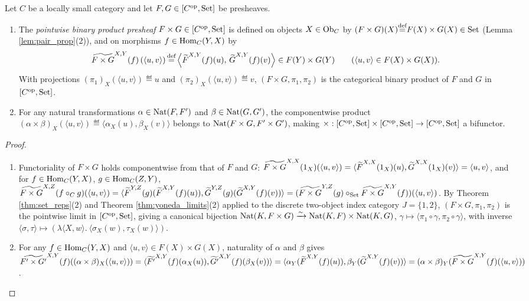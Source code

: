 \documentclass[10pt,a4paper]{article}
\renewcommand{\myprf}{\begin{proof}}
\renewcommand{\myqed}{\end{proof}}
\begin{document}
\begin{lemma}\label{lem:presheaf_product}
Let $C$ be a locally small category and let $F, G \in [C^{\textrm{op}}, {\textrm{Set}}]$ be presheaves.
\begin{enumerate}
\item The \emph{pointwise binary product presheaf} $F \times G \in [C^{\textrm{op}}, {\textrm{Set}}]$ is defined on objects $X \in {\textrm{Ob}}_C$ by $(F \times G)(X) {\stackrel{{\textrm{def}}}{=}} F(X) \times G(X) \in {\textrm{Set}}$ (Lemma \ref{lem:pair_prop}(2)), and on morphisms $f \in {\textrm{Hom}}_C(Y, X)$ by
$$\widetilde{F \times G}^{X,Y}(f)\left(\langle u, v \rangle\right) {\stackrel{{\textrm{def}}}{=}} \left\langle {\widetilde{F}\textrm{}}^{X,Y}(f)(u),\, {\widetilde{G}\textrm{}}^{X,Y}(f)(v) \right\rangle \in F(Y) \times G(Y) \qquad (\langle u, v \rangle \in F(X) \times G(X)).$$
With projections $(\pi_1)_X(\langle u, v \rangle) \eqdef u$ and $(\pi_2)_X(\langle u, v \rangle) \eqdef v$, $(F \times G, \pi_1, \pi_2)$ is the categorical binary product of $F$ and $G$ in $[C^{\textrm{op}}, {\textrm{Set}}]$.
\item For any natural transformations $\alpha \in {\textrm{Nat}}(F, F')$ and $\beta \in {\textrm{Nat}}(G, G')$, the componentwise product $(\alpha \times \beta)_X(\langle u, v \rangle) \eqdef \langle \alpha_X(u), \beta_X(v) \rangle$ belongs to ${\textrm{Nat}}(F \times G, F' \times G')$, making $\times : [C^{\textrm{op}}, {\textrm{Set}}] \times [C^{\textrm{op}}, {\textrm{Set}}] \to [C^{\textrm{op}}, {\textrm{Set}}]$ a bifunctor.
\end{enumerate}
\end{lemma}
\myprf
\begin{enumerate}
\item Functoriality of $F \times G$ holds componentwise from that of $F$ and $G$: $\widetilde{F \times G}^{X,X}(1_X)(\langle u, v \rangle) = \langle {\widetilde{F}\textrm{}}^{X,X}(1_X)(u), {\widetilde{G}\textrm{}}^{X,X}(1_X)(v) \rangle = \langle u, v \rangle$, and for $f \in {\textrm{Hom}}_C(Y, X)$, $g \in {\textrm{Hom}}_C(Z, Y)$, $\widetilde{F \times G}^{X,Z}(f \circ_C g)(\langle u, v \rangle) = \langle {\widetilde{F}\textrm{}}^{Y,Z}(g)({\widetilde{F}\textrm{}}^{X,Y}(f)(u)), {\widetilde{G}\textrm{}}^{Y,Z}(g)({\widetilde{G}\textrm{}}^{X,Y}(f)(v)) \rangle = (\widetilde{F \times G}^{Y,Z}(g) \circ_{\textrm{Set}} \widetilde{F \times G}^{X,Y}(f))(\langle u, v \rangle)$. By Theorem \ref{thm:set_reps}(2) and Theorem \ref{thm:yoneda_limits}(2) applied to the discrete two-object index category $J = \{1, 2\}$, $(F \times G, \pi_1, \pi_2)$ is the pointwise limit in $[C^{\textrm{op}}, {\textrm{Set}}]$, giving a canonical bijection ${\textrm{Nat}}(K, F \times G) \xrightarrow{\sim} {\textrm{Nat}}(K, F) \times {\textrm{Nat}}(K, G)$, $\gamma \mapsto \langle \pi_1 \circ \gamma, \pi_2 \circ \gamma \rangle$, with inverse $\langle \sigma, \tau \rangle \mapsto (\lambda \langle X, w \rangle.\ \langle \sigma_X(w), \tau_X(w) \rangle)$.
\item For any $f \in {\textrm{Hom}}_C(Y, X)$ and $\langle u, v \rangle \in F(X) \times G(X)$, naturality of $\alpha$ and $\beta$ gives $\widetilde{F' \times G'}^{X,Y}(f)((\alpha \times \beta)_X(\langle u, v \rangle)) = \langle \widetilde{F'}^{X,Y}(f)(\alpha_X(u)), \widetilde{G'}^{X,Y}(f)(\beta_X(v)) \rangle = \langle \alpha_Y({\widetilde{F}\textrm{}}^{X,Y}(f)(u)), \beta_Y({\widetilde{G}\textrm{}}^{X,Y}(f)(v)) \rangle = (\alpha \times \beta)_Y(\widetilde{F \times G}^{X,Y}(f)(\langle u, v \rangle))$.
\end{enumerate}
\myqed
\end{document}
